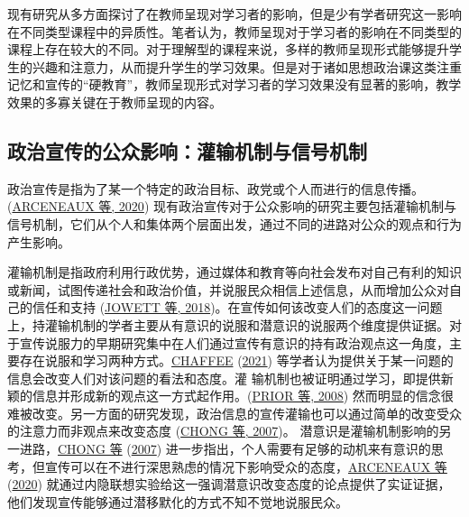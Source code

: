 \documentclass[
  12pt,
]{ctexart}
\begin{document}
现有研究从多方面探讨了在教师呈现对学习者的影响，但是少有学者研究这一影响在不同类型课程中的异质性。笔者认为，教师呈现对于学习者的影响在不同类型的课程上存在较大的不同。对于理解型的课程来说，多样的教师呈现形式能够提升学生的兴趣和注意力，从而提升学生的学习效果。但是对于诸如思想政治课这类注重记忆和宣传的``硬教育''，教师呈现形式对学习者的学习效果没有显著的影响，教学效果的多寡关键在于教师呈现的内容。

\hypertarget{ux653fux6cbbux5ba3ux4f20ux7684ux516cux4f17ux5f71ux54cdux704cux8f93ux673aux5236ux4e0eux4fe1ux53f7ux673aux5236}{%
\subsection{政治宣传的公众影响：灌输机制与信号机制}\label{ux653fux6cbbux5ba3ux4f20ux7684ux516cux4f17ux5f71ux54cdux704cux8f93ux673aux5236ux4e0eux4fe1ux53f7ux673aux5236}}

政治宣传是指为了某一个特定的政治目标、政党或个人而进行的信息传播。(\protect\hyperlink{ref-ArceneauxTruex2020}{ARCENEAUX 等, 2020}) 现有政治宣传对于公众影响的研究主要包括灌输机制与信号机制，它们从个人和集体两个层面出发，通过不同的进路对公众的观点和行为产生影响。

灌输机制是指政府利用行政优势，通过媒体和教育等向社会发布对自己有利的知识或新闻，试图传递社会和政治价值，并说服民众相信上述信息，从而增加公众对自己的信任和支持 (\protect\hyperlink{ref-JowettODonnell2018}{JOWETT 等, 2018})。在宣传如何该改变人们的态度这一问题上，持灌输机制的学者主要从有意识的说服和潜意识的说服两个维度提供证据。对 于宣传说服力的早期研究集中在人们通过宣传有意识的持有政治观点这一角度，主要存在说服和学习两种方式。\protect\hyperlink{ref-Chaffee2021}{CHAFFEE} (\protect\hyperlink{ref-Chaffee2021}{2021}) 等学者认为提供关于某一问题的信息会改变人们对该问题的看法和态度。灌 输机制也被证明通过学习，即提供新颖的信息并形成新的观点这一方式起作用。(\protect\hyperlink{ref-PriorLupia2008}{PRIOR 等, 2008}) 然而明显的信念很难被改变。另一方面的研究发现，政治信息的宣传灌输也可以通过简单的改变受众的注意力而非观点来改变态度 (\protect\hyperlink{ref-ChongDruckman2007}{CHONG 等, 2007})。
潜意识是灌输机制影响的另一进路，\protect\hyperlink{ref-ChongDruckman2007}{CHONG 等} (\protect\hyperlink{ref-ChongDruckman2007}{2007}) 进一步指出，个人需要有足够的动机来有意识的思考，但宣传可以在不进行深思熟虑的情况下影响受众的态度，\protect\hyperlink{ref-ArceneauxTruex2020}{ARCENEAUX 等} (\protect\hyperlink{ref-ArceneauxTruex2020}{2020}) 就通过内隐联想实验给这一强调潜意识改变态度的论点提供了实证证据，他们发现宣传能够通过潜移默化的方式不知不觉地说服民众。
\end{document}
